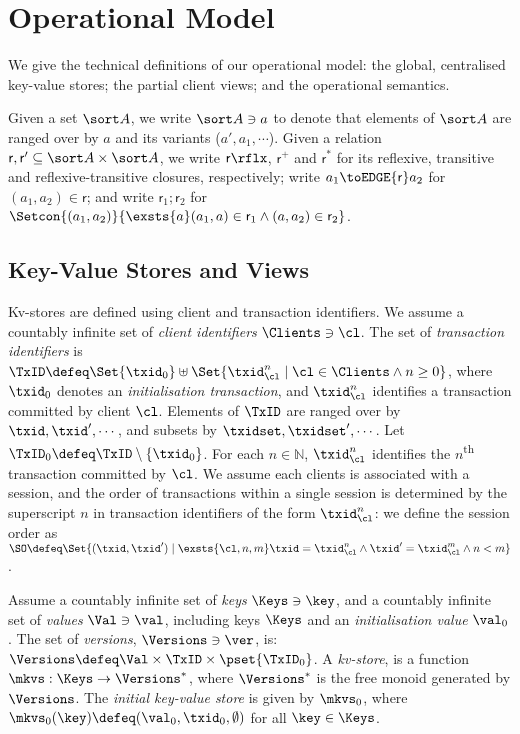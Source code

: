 \section{Operational Model}
\label{sec:model}

We give the technical definitions of our operational model: 
the global, centralised key-value stores; the partial client views;  and the
operational semantics. 

Given a set $\sort A$, we write $\sort A \ni a$ to denote that elements of $\sort A$ are ranged over by $a$ and its variants (\eg $a', a_1, \cdots$). 
Given a relation $\mathsf r, \mathsf r' \subseteq \sort A \times \sort A$,
we write $\mathsf r\rflx$, $\mathsf r^+$ and $\mathsf r^*$ for its reflexive, transitive and reflexive-transitive closures, respectively;
write $a_1 \toEDGE{\mathsf r} a_2$ for $(a_1, a_2) \in \mathsf r$;
and write \( \mathsf r_1 ; \mathsf r_2\) for \( \Setcon{(a_1,a_2)}{\exsts{a} (a_1,a) \in \mathsf r_1 \land (a,a_2) \in \mathsf r_2}\).

\subsection{Key-Value Stores and Views}
\label{subsec:kvstores}
\label{sec:mkvs-view}
Kv-stores are defined using client and transaction identifiers.
We assume a countably infinite set of \emph{client identifiers} $\Clients \ni \cl$. 
The set of \emph{transaction identifiers} is  
$\TxID \defeq  \Set{\txid_{0}} \uplus \Set{ \txid_{\cl}^{n} \mid \cl
  \in \Clients \wedge n \geq 0 }$, 
where  $\txid_0$ denotes  an \emph{initialisation transaction}, 
and $\txid_{\cl}^{n}$ identifies a transaction committed by client $\cl$. 
Elements of $\TxID$ are ranged over by
$\txid, \txid', \cdots$, and subsets by $\txidset, \txidset', \cdots$. 
Let $\TxID_{0} \defeq \TxID \setminus \{ \txid_0\}$. 
For each $n \in \mathbb{N}$, $\txid_{\cl}^{n}$ identifies the $n$\textsuperscript{th} transaction  committed by $\cl$.
We assume each clients is associated with a session, 
and the order of transactions within a single session is determined by the superscript 
$n$ in transaction identifiers of the form $\txid_{\cl}^{n}$: we define the session order 
as 
$\SO \defeq \Set{ (\txid, \txid') \mid \exsts{ \cl, n,m } \txid =
  \txid_{\cl}^{n} \wedge \txid' = \txid_{\cl}^{m} \wedge n < m}$.

\begin{definition}[Kv-stores]
\label{def:his_heap}
\label{def:mkvs}
Assume a countably infinite set of \emph{keys} $\Keys \ni \key$, 
and a countably infinite set of  \emph{values} $\Val \ni \val$, 
including keys \( \Keys \) and an \emph{initialisation value} $\val_0$.
The set of \emph{versions}, $\Versions \ni \ver$, is: $\Versions \defeq \Val \times \TxID \times \pset{\TxID_{0}}$. 
A \emph{kv-store}, 
is a function $\mkvs: \Keys \to \Versions^{\ast}$, 
where $\Versions^{\ast}$ is the free monoid generated by $\Versions$. 
The \emph{initial key-value store} is given by $\mkvs_0$, where 
$\mkvs_{0}(\key)\defeq  (\val_0, \txid_0, \emptyset)$ for
all $\key \in \Keys$.
\end{definition}

